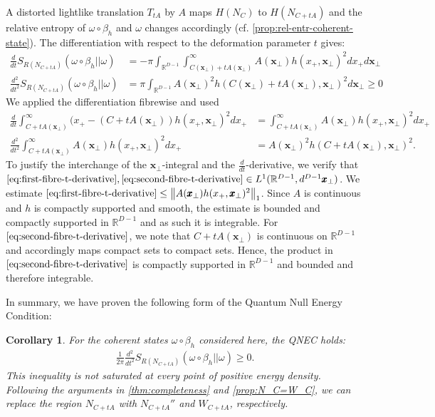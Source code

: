 \documentclass[12pt]{article}
\def\RR{{\mathbb R}}
\def\b{\beta}
\def\tx{\pmb{x}}
\newcommand{\norm}[1]{\left\lVert#1\right\rVert}
\newtheorem{corollary}[theorem]{Corollary}
\theoremstyle{remark}
\begin{document}
A distorted lightlike translation $T_{tA}$ by $A$ maps $H(N_C)$ to $H(N_{C+tA})$ and the relative entropy of $\omega\circ \b_h$ and $\omega$ changes accordingly (cf. \autoref{prop:rel-entr-coherent-state}). The differentiation with respect to the deformation parameter $t$ gives:
\begin{align}
	\frac{d}{dt}S_{R(N_{C+tA})}(\omega\circ\beta_h||\omega)&=-\pi \int_{\RR^{D-1}}\int_{C(\tx_\perp)+tA(\tx_\perp)}^\infty A(\tx_\perp)h(x_+,\tx_\perp)^2 dx_+d\tx_\perp\label{eq:first-derivative-relative-entropy}\\ 
	\frac{d^2}{dt^2}S_{R(N_{C+tA})} (\omega\circ\beta_h||\omega)&=\pi \int_{\RR^{D-1}} A(\tx_\perp)^2 h(C(\tx_\perp)+tA(\tx_\perp),\tx_\perp)^2 d\tx_\perp\geq 0
	\nonumber
\end{align}
We applied the differentiation fibrewise and used 
\begin{align}
	\frac{d}{dt}\int_{C+tA(\tx_\perp)}^{\infty}(x_+-(C+tA(\tx_\perp)) h(x_+,\tx_\perp)^2 dx_+ &=\int_{C+tA(\tx_\perp)}^\infty A(\tx_\perp)h(x_+,\tx_\perp)^2 dx_+\label{eq:first-fibre-t-derivative}\\
	\frac{d^2}{dt^2}\int_{C+tA(\tx_\perp)}^\infty A(\tx_\perp)h(x_+,\tx_\perp)^2 dx_+&= A(\tx_\perp)^2 h(C+tA(\tx_\perp),\tx_\perp)^2 \label{eq:second-fibre-t-derivative}.		
\end{align}
To justify the interchange of the $\tx_\perp$-integral and the $\frac{d}{dt}$-derivative, we verify that $\eqref{eq:first-fibre-t-derivative}, \eqref{eq:second-fibre-t-derivative}\in L^1(\RR^{D-1},d^{D-1}\tx_\perp)$. We estimate $\eqref{eq:first-fibre-t-derivative}\leq \norm{A(\tx_\perp)h(x_+,\tx_\perp)^2}_1$. Since $A$ is continuous and $h$ is compactly supported and smooth, the estimate is bounded and compactly supported in $\RR^{D-1}$ and as such it is integrable. For $\eqref{eq:second-fibre-t-derivative}$, we note that $C+tA(\tx_\perp)$ is continuous on $\RR^{D-1}$ and accordingly maps compact sets to compact sets. Hence, the product in $\eqref{eq:second-fibre-t-derivative}$ is compactly supported in $\RR^{D-1}$ and bounded and therefore integrable.  

In summary, we have proven the following form of the Quantum Null Energy Condition:
\begin{corollary}
	For the coherent states $\omega\circ\beta_h$ considered here, the QNEC holds:
		\begin{align*}
			\frac{1}{2\pi}\frac{d^2}{dt^2}S_{R(N_{C+tA})} (\omega\circ\beta_h||\omega)\geq 0.
		\end{align*}
	This inequality is not saturated at every point of positive energy density. Following the arguments in \autoref{thm:completeness} and \autoref{prop:N_C=W_C}, we can replace the region $N_{C+tA}$ with $N_{C+tA}''$ and $W_{C+tA}$, respectively.
\end{corollary}
\end{document}
